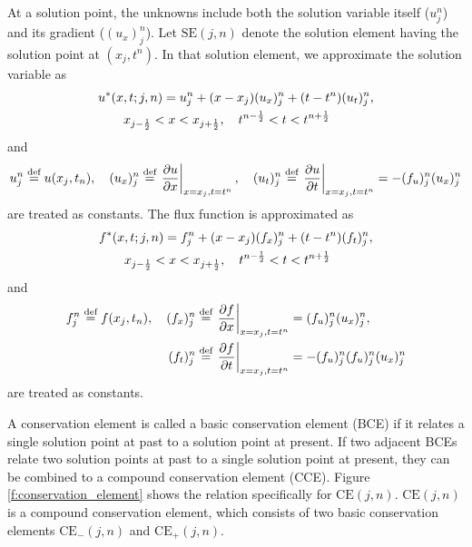 \documentclass[a4paper,12pt,dvips]{article}
\newcommand*\defeq{\buildrel{\text{def}}\over{=}}
\begin{document}
At a solution point, the unknowns include both the solution variable itself
($u_j^n$) and its gradient ($(u_x)_j^n$).  Let $\mathrm{SE}(j,n)$ denote the
solution element having the solution point at $(x_j, t^n)$.  In that solution
element, we approximate the solution variable as
\begin{align}
  &u^*(x,t; j,n) = u_j^n + (x-x_j) (u_x)_j^n + (t-t^n) (u_t)_j^n,
  \label{e:solapprox} \\
  &\quad\quad
  x_{j-\frac{1}{2}} < x < x_{j+\frac{1}{2}}, \quad
  t^{n-\frac{1}{2}} < t < t^{n+\frac{1}{2}} \notag
\end{align}
and
\begin{align*}
  u_j^n \defeq u(x_j, t_n), \quad
  (u_x)_j^n \defeq \left.\frac{\partial u}{\partial x}\right|_{x=x_j,t=t^n},
  \quad
  (u_t)_j^n \defeq \left.\frac{\partial u}{\partial t}\right|_{x=x_j,t=t^n}
  = -(f_u)_j^n (u_x)_j^n
\end{align*}
are treated as constants.  The flux function is approximated as
\begin{align}
  &f^*(x,t; j,n) = f_j^n + (x-x_j) (f_x)_j^n + (t-t^n) (f_t)_j^n,
  \label{e:fluxapprox} \\
  &\quad\quad
  x_{j-\frac{1}{2}} < x < x_{j+\frac{1}{2}}, \quad
  t^{n-\frac{1}{2}} < t < t^{n+\frac{1}{2}} \notag
\end{align}
and
\begin{align*}
  f_j^n \defeq f(x_j, t_n), \quad
  (f_x)_j^n &\defeq \left.\frac{\partial f}{\partial x}\right|_{x=x_j,t=t^n}
  = (f_u)_j^n (u_x)_j^n, \\
  (f_t)_j^n &\defeq \left.\frac{\partial f}{\partial t}\right|_{x=x_j,t=t^n}
  = -(f_u)_j^n (f_u)_j^n (u_x)_j^n
\end{align*}
are treated as constants.

A conservation element is called a basic conservation element (BCE) if it
relates a single solution point at past to a solution point at present.  If two
adjacent BCEs relate two solution points at past to a single solution point at
present, they can be combined to a compound conservation element (CCE).  Figure
\ref{f:conservation_element} shows the relation specifically for
$\mathrm{CE}(j,n)$.  $\mathrm{CE}(j,n)$ is a compound conservation element,
which consists of two basic conservation elements $\mathrm{CE}_-(j,n)$ and
$\mathrm{CE}_+(j,n)$.
\end{document}
